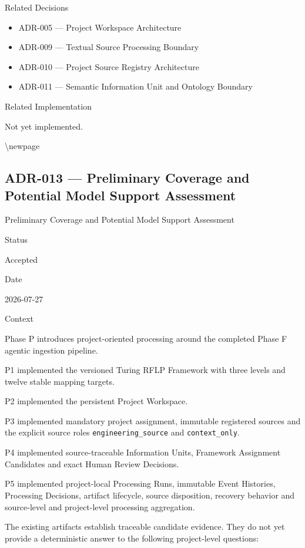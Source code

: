 Related Decisions

\begin{itemize}
\tightlist
\item
  ADR-005 --- Project Workspace Architecture
\item
  ADR-009 --- Textual Source Processing Boundary
\item
  ADR-010 --- Project Source Registry Architecture
\item
  ADR-011 --- Semantic Information Unit and Ontology Boundary
\end{itemize}

Related Implementation

Not yet implemented.

\textbackslash newpage

\hypertarget{adr-013--preliminary-coverage-and-potential-model-support-assessment}{%
\subsection{ADR-013 --- Preliminary Coverage and Potential Model Support Assessment}\label{adr-013--preliminary-coverage-and-potential-model-support-assessment}}

Preliminary Coverage and Potential Model Support Assessment

Status

Accepted

Date

2026-07-27

Context

Phase P introduces project-oriented processing around the completed Phase F agentic ingestion pipeline.

P1 implemented the versioned Turing RFLP Framework with three levels and twelve stable mapping targets.

P2 implemented the persistent Project Workspace.

P3 implemented mandatory project assignment, immutable registered sources and the explicit source roles \texttt{engineering\_source} and \texttt{context\_only}.

P4 implemented source-traceable Information Units, Framework Assignment Candidates and exact Human Review Decisions.

P5 implemented project-local Processing Runs, immutable Event Histories, Processing Decisions, artifact lifecycle, source disposition, recovery behavior and source-level and project-level processing aggregation.

The existing artifacts establish traceable candidate evidence. They do not yet provide a deterministic answer to the following project-level questions:

